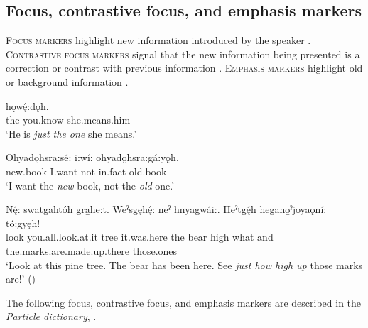 \subsection{Focus, contrastive focus, and emphasis markers} \label{ch:Focus, contrastive focus, and emphasis markers}
\textsc{Focus markers} highlight new information introduced by the speaker . \textsc{Contrastive focus markers} signal that the new information being presented is a correction or contrast with previous information . \textsc{Emphasis markers} highlight old or background information . 

\ea\label{ex:focus}
 \gll {}  hǫwę́:dǫh. \\
the you.know she.means.him\\
\glt ‘He is \emph{just the one} she means.’
\z

\ea\label{ex:contrastivefocus}
 \gll Ohyadǫhsra:sé: i:wí:   ohyadǫ̱hsra:gá:yǫh.\\
new.book I.want not in.fact old.book\\
\glt ‘I want the \emph{new} book, not the \emph{old} one.’
\z

\ea\label{ex:emphasisingeneral}
 \gll Nę́: swatgahtóh gra̱he:t. Weˀsgęhę́: neˀ hnyagwái:. Heˀtgę́h   hegano̱ˀjoyaǫní: tó:gyęh!\\
look you.all.look.at.it tree it.was.here the bear high what and the.marks.are.made.up.there those.ones\\
\glt ‘Look at this pine tree. The bear has been here. See \emph{just how high up} those marks are!’ (\cite{carrier_legends_2013})
\z

The following focus, contrastive focus, and emphasis markers are described in the \textit{Particle dictionary}, .

